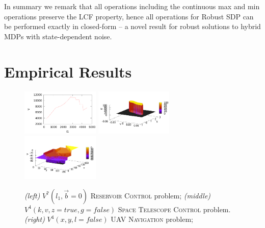 \documentclass[letterpaper]{article}
\begin{document}
In summary we remark that all operations including the
continuous max and min operations preserve the LCF property,
hence all operations for Robust SDP can be performed exactly in
closed-form -- a novel result for robust solutions to hybrid MDPs
with state-dependent noise.

\section{Empirical Results}

\begin{figure}[tbp!]
\centering
\includegraphics[width=0.33\textwidth]{Figures/reserV7New.pdf}
\includegraphics[width=0.33\textwidth]{Figures/telesV4.pdf}
\includegraphics[width=0.33\textwidth]{Figures/uavV4.pdf}
\vspace{-6mm}
\caption{\footnotesize
{\it (left)}  $V^7(l_1,\vec{b}=0)$ \textsc{Reservoir Control} problem;
{\it (middle)} $V^4(k,v,z=true,g=false)$ \textsc{Space Telescope Control} problem.
{\it (right)}  $V^4(x,y,l=false)$ \textsc{UAV Navigation} problem;
}
\label{fig:Value}
\end{figure}
\end{document}
